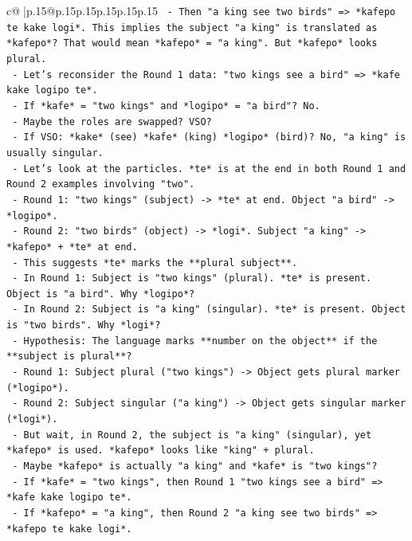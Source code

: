 \documentclass{article}
\begin{document}
{\begin{supertabular}{c@{$\;$}|p{.15\linewidth}@{}p{.15\linewidth}p{.15\linewidth}p{.15\linewidth}p{.15\linewidth}p{.15\linewidth}}
{{{\texttt{        {-} Then "a king see two birds" => *kafepo te kake logi*. This implies the subject "a king" is translated as *kafepo*? That would mean *kafepo* = "a king". But *kafepo* looks plural.} \\
\texttt{        {-} Let's reconsider the Round 1 data: "two kings see a bird" => *kafe kake logipo te*.} \\
\texttt{          {-} If *kafe* = "two kings" and *logipo* = "a bird"? No.} \\
\texttt{          {-} Maybe the roles are swapped? VSO?} \\
\texttt{          {-} If VSO: *kake* (see) *kafe* (king) *logipo* (bird)? No, "a king" is usually singular.} \\
\texttt{          {-} Let's look at the particles. *te* is at the end in both Round 1 and Round 2 examples involving "two".} \\
\texttt{          {-} Round 1: "two kings" (subject) {-}> *te* at end. Object "a bird" {-}> *logipo*.} \\
\texttt{          {-} Round 2: "two birds" (object) {-}> *logi*. Subject "a king" {-}> *kafepo* + *te* at end.} \\
\texttt{          {-} This suggests *te* marks the **plural subject**.} \\
\texttt{          {-} In Round 1: Subject is "two kings" (plural). *te* is present. Object is "a bird". Why *logipo*?} \\
\texttt{          {-} In Round 2: Subject is "a king" (singular). *te* is present. Object is "two birds". Why *logi*?} \\
\texttt{          {-} Hypothesis: The language marks **number on the object** if the **subject is plural**?} \\
\texttt{            {-} Round 1: Subject plural ("two kings") {-}> Object gets plural marker (*logipo*).} \\
\texttt{            {-} Round 2: Subject singular ("a king") {-}> Object gets singular marker (*logi*).} \\
\texttt{            {-} But wait, in Round 2, the subject is "a king" (singular), yet *kafepo* is used. *kafepo* looks like "king" + plural.} \\
\texttt{            {-} Maybe *kafepo* is actually "a king" and *kafe* is "two kings"?} \\
\texttt{              {-} If *kafe* = "two kings", then Round 1 "two kings see a bird" => *kafe kake logipo te*.} \\
\texttt{              {-} If *kafepo* = "a king", then Round 2 "a king see two birds" => *kafepo te kake logi*.} \\
}}}
\end{supertabular}}
\end{document}
